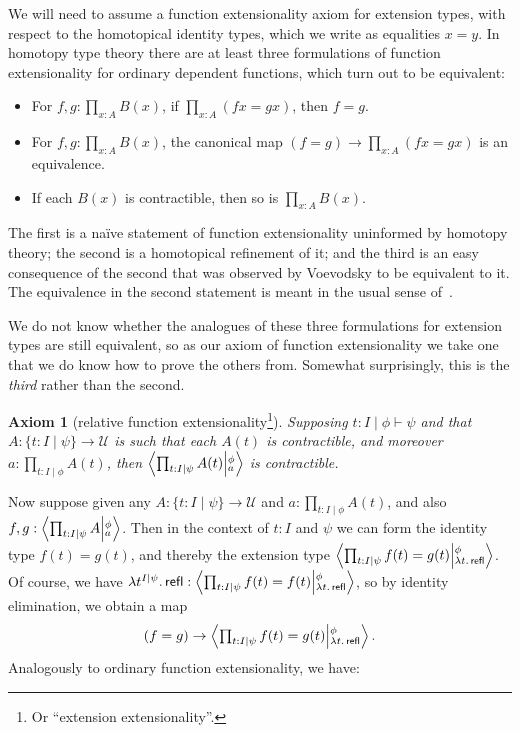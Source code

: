 \documentclass{amsart}
\theoremstyle{plain}
\newtheorem{ax}[thm]{Axiom}
\theoremstyle{definition}
\theoremstyle{remark}
\numberwithin{equation}{section}
\newcommand{\tprod}{\textstyle\prod}
\newcommand{\exten}[4]{\left\langle\mathchoice{\textstyle\prod_{#1}}{\textstyle\prod_{#1}}{\scriptstyle\prod_{#1}}{\scriptscriptstyle\prod_{#1}} #2 \middle|^{#3}_{#4}\right\rangle}
\newcommand{\types}{\vdash}
\newcommand{\univtype}{\mathcal{U}}
\newcommand{\sh}[2]{\{#1\mid #2\}}
\newcommand{\refl}{\mathsf{refl}}
\newcommand{\lam}[1]{\lambda #1.\,}
\begin{document}
We will need to assume a function extensionality axiom for extension types, with respect to the homotopical identity types, which we write as equalities $x=y$.
In homotopy type theory there are at least three formulations of function extensionality for ordinary dependent functions, which turn out to be equivalent:
\begin{itemize}
\item For $f,g:\tprod_{x:A}B(x)$, if $\tprod_{x:A} (fx=gx)$, then $f=g$.
\item For $f,g:\tprod_{x:A}B(x)$, the canonical map $(f=g) \to \tprod_{x:A} (fx=gx)$ is an equivalence.
\item If each $B(x)$ is contractible, then so is $\tprod_{x:A} B(x)$.
\end{itemize}
The first is a na\"{i}ve statement of function extensionality uninformed by homotopy theory; the second is a homotopical refinement of it; and the third is an easy consequence of the second that was observed by Voevodsky to be equivalent to it. The equivalence in the second statement is meant  in the usual sense of~\cite[\S4.5]{hottbook}.


We do not know whether the analogues of these three formulations for extension types are still equivalent, so as our axiom of function extensionality we take one that we do know how to prove the others from.
Somewhat surprisingly, this is the \emph{third} rather than the second.

\begin{ax}[relative function extensionality\footnote{Or ``extension extensionality''.}]\label{ax:extfunext}
{ Supposing $t:I \mid \phi\types\psi$ and that $A:\sh{t:I}{\psi}\to\univtype$ is such that each $A(t)$ is contractible, and moreover $a:\tprod_{t:I\mid\phi} A(t)$, then $\exten{t:I\mid\psi}{A(t)}{\phi}{a}$ is contractible.}
\end{ax}

Now suppose given any $A:\sh{t:I}{\psi}\to\univtype$ and $a:\tprod_{t:I\mid\phi} A(t)$, and also $f,g:\exten{t:I \mid \psi}{A}{\phi}{a}$.
Then in the context of $t:I$ and $\psi$ we can form the identity type $f(t)=g(t)$, and thereby the extension type $\exten{t:I \mid \psi}{f(t)=g(t)}{\phi}{\lam{t}\refl}$.
Of course, we have $\lam{t^{I\mid\psi}} \refl : \exten{t:I \mid \psi}{f(t)=f(t)}{\phi}{\lam{t}\refl}$, so by identity elimination, we obtain a map
\begin{equation} (f=g) \to \exten{t:I \mid \psi}{f(t)=g(t)}{\phi}{\lam{t}\refl}.\label{eq:extension-extensionality}
\end{equation}
Analogously to ordinary function extensionality, we have:
\end{document}
